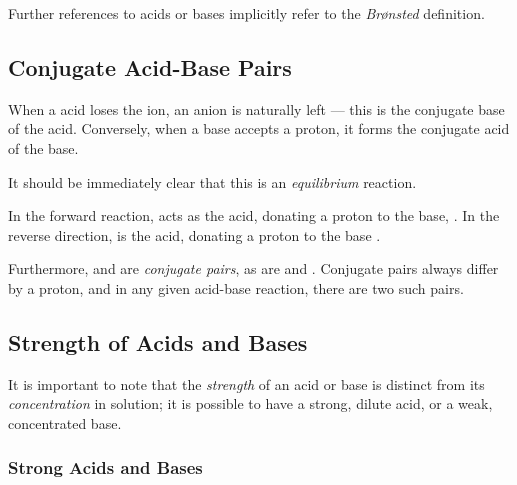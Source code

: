 			Further references to acids or bases implicitly refer to the \textit{Brønsted} definition.




		\pagebreak
		\subsection{Conjugate Acid-Base Pairs}

			When a acid loses the  ion, an anion is naturally left --- this is the conjugate base of the acid. Conversely, when a
			base accepts a proton, it forms the conjugate acid of the base.


			It should be immediately clear that this is an \textit{equilibrium} reaction.

			In the forward reaction,  acts as the acid, donating a proton to the base, . In the reverse direction,
			 is the acid, donating a proton to the base .

			 Furthermore,  and  are \textit{conjugate pairs}, as are  and . Conjugate pairs always
			 differ by a proton, and in any given acid-base reaction, there are two such pairs.



		\subsection{Strength of Acids and Bases}

			It is important to note that the \textit{strength} of an acid or base is distinct from its \textit{concentration} in solution;
			it is possible to have a strong, dilute acid, or a weak, concentrated base.

			\subsubsection{Strong Acids and Bases}

